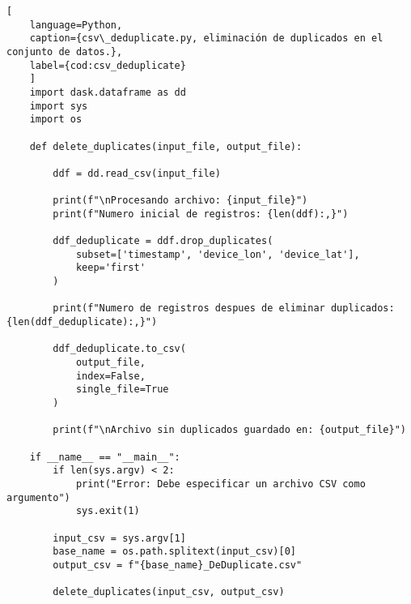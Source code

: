 \begin{lstlisting}[
    language=Python,
    caption={csv\_deduplicate.py, eliminación de duplicados en el conjunto de datos.},
    label={cod:csv_deduplicate}
    ]
    import dask.dataframe as dd
    import sys
    import os

    def delete_duplicates(input_file, output_file):
    
        ddf = dd.read_csv(input_file)
        
        print(f"\nProcesando archivo: {input_file}")
        print(f"Numero inicial de registros: {len(ddf):,}")
        
        ddf_deduplicate = ddf.drop_duplicates(
            subset=['timestamp', 'device_lon', 'device_lat'],
            keep='first'
        )
        
        print(f"Numero de registros despues de eliminar duplicados: {len(ddf_deduplicate):,}")
        
        ddf_deduplicate.to_csv(
            output_file,
            index=False,
            single_file=True
        )
        
        print(f"\nArchivo sin duplicados guardado en: {output_file}")

    if __name__ == "__main__":
        if len(sys.argv) < 2:
            print("Error: Debe especificar un archivo CSV como argumento")
            sys.exit(1)

        input_csv = sys.argv[1]
        base_name = os.path.splitext(input_csv)[0]
        output_csv = f"{base_name}_DeDuplicate.csv" 
        
        delete_duplicates(input_csv, output_csv)
\end{lstlisting}